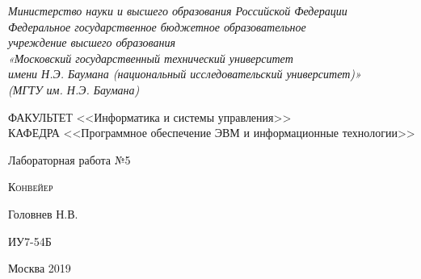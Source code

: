 \documentclass[a4paper,12pt]{article}
\begin{document}

\begin{titlepage}
\newpage

\begin{center}

\textit{Министерство науки и высшего образования Российской Федерации \\ 
Федеральное государственное бюджетное образовательное \\
учреждение высшего образования \\
«Московский государственный технический университет \\
имени Н.Э. Баумана (национальный исследовательский университет)» \\
(МГТУ им. Н.Э. Баумана) \\}
\hrulefill
\end{center}

\vspace{2em}

\begin{flushleft}
ФАКУЛЬТЕТ <<Информатика и системы управления>> \\
\vspace{0.5em}
КАФЕДРА <<Программное обеспечение ЭВМ и информационные технологии>>
\end{flushleft}


\vspace{8em}

\begin{center}
\LARGE Лабораторная работа №5 \\
\end{center}

\vspace{1.5em}

\begin{center}
\textsc{Конвейер}
\end{center}

\vspace{6em}

\begin{center}
Головнев Н.В.

\vspace{4em}

ИУ7-54Б
\end{center}

\vspace{\fill}

\begin{center}
Москва 2019
\end{center}

\end{titlepage}
\end{document}
